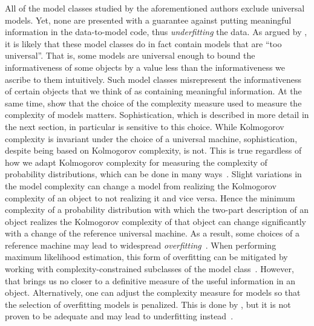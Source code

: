 All of the model classes studied by the aforementioned authors exclude universal models.
Yet, none are presented with a guarantee against putting meaningful information in the data-to-model code, thus \emph{underfitting} the data.
As argued by \textcite{bloem2015two}, it is likely that these model classes do in fact contain models that are \enquote{too universal}.
That is, some models are universal enough to bound the informativeness of some objects by a value less than the informativeness we ascribe to them intuitively.
Such model classes misrepresent the informativeness of certain objects that we think of as containing meaningful information.
At the same time, \textcite{vereshchagin2009algorithmic,bloem2015two,antunes2017sophistication} show that the choice of the complexity measure used to measure the complexity of models matters.
Sophistication, which is described in more detail in the next section, in particular is sensitive to this choice.
While Kolmogorov complexity is invariant under the choice of a universal machine, sophistication, despite being based on Kolmogorov complexity, is not.
This is true regardless of how we adapt Kolmogorov complexity for measuring the complexity of probability distributions, which can be done in many ways~\parencite{gacs2001algorithmic}.
Slight variations in the model complexity can change a model from realizing the Kolmogorov complexity of an object to not realizing it and vice versa.
Hence the minimum complexity of a probability distribution with which the two-part description of an object realizes the Kolmogorov complexity of that object can change significantly with a change of the reference universal machine.
As a result, some choices of a reference machine may lead to widespread \emph{overfitting}~\parencite{bloem2015two}.
When performing maximum likelihood estimation, this form of overfitting can be mitigated by working with complexity-constrained subclasses of the model class~\parencite{vereshchagin2004kolmogorov}.
However, that brings us no closer to a definitive measure of the useful information in an object.
Alternatively, one can adjust the complexity measure for models so that the selection of overfitting models is penalized.
This is done by \textcite{rissanen1983universal,antunes2009sophistication}, but it is not proven to be adequate and may lead to underfitting instead~\parencite{bloem2015two}.

